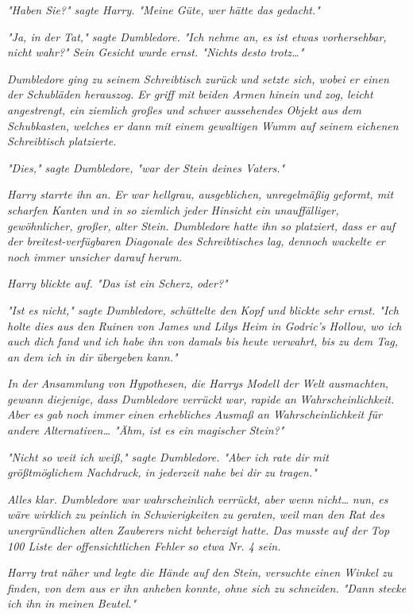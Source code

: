 {\emph{"Haben Sie?" sagte Harry. "Meine Güte, wer hätte das gedacht."}

\emph{"Ja, in der Tat," sagte Dumbledore. "Ich nehme an, es ist etwas vorhersehbar, nicht wahr?" Sein Gesicht wurde ernst. "Nichts desto trotz…"}

\emph{Dumbledore ging zu seinem Schreibtisch zurück und setzte sich, wobei er einen der Schubläden herauszog. Er griff mit beiden Armen hinein und zog, leicht angestrengt, ein ziemlich großes und schwer aussehendes Objekt aus dem Schubkasten, welches er dann mit einem gewaltigen Wumm auf seinem eichenen Schreibtisch platzierte.}

\emph{"Dies," sagte Dumbledore, "war der Stein deines Vaters."}

\emph{Harry starrte ihn an. Er war hellgrau, ausgeblichen, unregelmäßig geformt, mit scharfen Kanten und in so ziemlich jeder Hinsicht ein unauffälliger, gewöhnlicher, großer, alter Stein. Dumbledore hatte ihn so platziert, dass er auf der breitest-verfügbaren Diagonale des Schreibtisches lag, dennoch wackelte er noch immer unsicher darauf herum.}

\emph{Harry blickte auf. "Das ist ein Scherz, oder?"}

\emph{"Ist es nicht," sagte Dumbledore, schüttelte den Kopf und blickte sehr ernst. "Ich holte dies aus den Ruinen von James und Lilys Heim in Godric's Hollow, wo ich auch dich fand und ich habe ihn von damals bis} \emph{heute verwahrt, bis zu dem Tag, an dem ich in dir übergeben kann."}

\emph{In der Ansammlung von Hypothesen, die Harrys Modell der Welt ausmachten, gewann diejenige, dass Dumbledore verrückt war, rapide an} \emph{Wahrscheinlichkeit. Aber es} \emph{\emph{gab}} \emph{noch immer einen erhebliches Ausmaß an Wahrscheinlichkeit für andere Alternativen… "Ähm, ist es ein} \emph{\emph{magischer}} \emph{Stein?"}

\emph{"Nicht so weit ich weiß," sagte Dumbledore. "Aber ich rate dir mit größtmöglichem Nachdruck, in jederzeit nahe bei dir zu tragen."}

\emph{Alles klar. Dumbledore war} \emph{\emph{wahrscheinlich}} \emph{verrückt, aber wenn} \emph{\emph{nicht…}} \emph{nun, es wäre wirklich} \emph{\emph{zu peinlich}} \emph{in Schwierigkeiten zu geraten, weil man den Rat des unergründlichen alten Zauberers nicht beherzigt hatte. Das musste auf der Top 100 Liste der offensichtlichen Fehler so etwa Nr. 4 sein.}

\emph{Harry trat näher und legte die Hände auf den Stein, versuchte einen Winkel zu finden, von dem aus er ihn anheben konnte, ohne sich zu schneiden. "Dann stecke ich ihn in meinen Beutel."}

}
